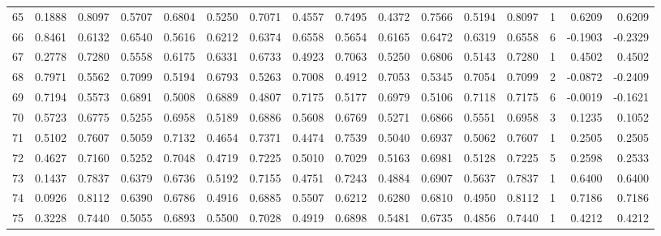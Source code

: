\begin{tabular}{lrrrrrrrrrrrrrrr}
65  &      0.1888 &  0.8097 &  0.5707 &  0.6804 &  0.5250 &  0.7071 &  0.4557 &  0.7495 &  0.4372 &  0.7566 &   0.5194 &     0.8097 &      1 &                    0.6209 &                     0.6209 \\
66  &      0.8461 &  0.6132 &  0.6540 &  0.5616 &  0.6212 &  0.6374 &  0.6558 &  0.5654 &  0.6165 &  0.6472 &   0.6319 &     0.6558 &      6 &                   -0.1903 &                    -0.2329 \\
67  &      0.2778 &  0.7280 &  0.5558 &  0.6175 &  0.6331 &  0.6733 &  0.4923 &  0.7063 &  0.5250 &  0.6806 &   0.5143 &     0.7280 &      1 &                    0.4502 &                     0.4502 \\
68  &      0.7971 &  0.5562 &  0.7099 &  0.5194 &  0.6793 &  0.5263 &  0.7008 &  0.4912 &  0.7053 &  0.5345 &   0.7054 &     0.7099 &      2 &                   -0.0872 &                    -0.2409 \\
69  &      0.7194 &  0.5573 &  0.6891 &  0.5008 &  0.6889 &  0.4807 &  0.7175 &  0.5177 &  0.6979 &  0.5106 &   0.7118 &     0.7175 &      6 &                   -0.0019 &                    -0.1621 \\
70  &      0.5723 &  0.6775 &  0.5255 &  0.6958 &  0.5189 &  0.6886 &  0.5608 &  0.6769 &  0.5271 &  0.6866 &   0.5551 &     0.6958 &      3 &                    0.1235 &                     0.1052 \\
71  &      0.5102 &  0.7607 &  0.5059 &  0.7132 &  0.4654 &  0.7371 &  0.4474 &  0.7539 &  0.5040 &  0.6937 &   0.5062 &     0.7607 &      1 &                    0.2505 &                     0.2505 \\
72  &      0.4627 &  0.7160 &  0.5252 &  0.7048 &  0.4719 &  0.7225 &  0.5010 &  0.7029 &  0.5163 &  0.6981 &   0.5128 &     0.7225 &      5 &                    0.2598 &                     0.2533 \\
73  &      0.1437 &  0.7837 &  0.6379 &  0.6736 &  0.5192 &  0.7155 &  0.4751 &  0.7243 &  0.4884 &  0.6907 &   0.5637 &     0.7837 &      1 &                    0.6400 &                     0.6400 \\
74  &      0.0926 &  0.8112 &  0.6390 &  0.6786 &  0.4916 &  0.6885 &  0.5507 &  0.6212 &  0.6280 &  0.6810 &   0.4950 &     0.8112 &      1 &                    0.7186 &                     0.7186 \\
75  &      0.3228 &  0.7440 &  0.5055 &  0.6893 &  0.5500 &  0.7028 &  0.4919 &  0.6898 &  0.5481 &  0.6735 &   0.4856 &     0.7440 &      1 &                    0.4212 &                     0.4212 \\

\end{tabular}
